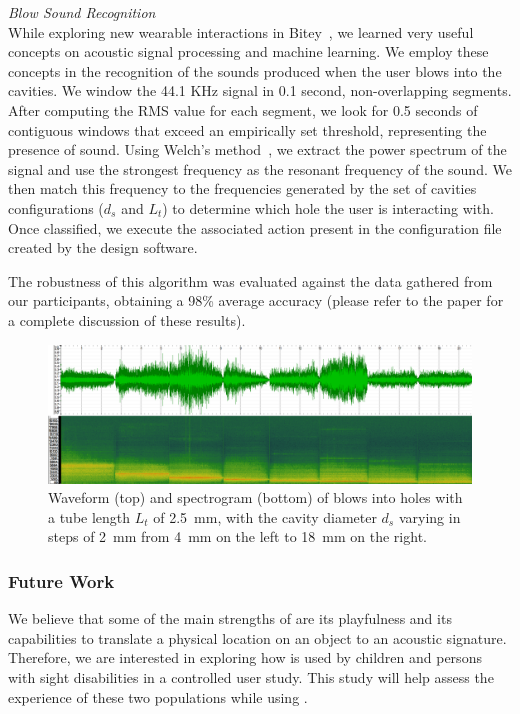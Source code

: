           \textit{Blow Sound Recognition}\\
            While exploring new wearable interactions in
            Bitey~\cite{Ashbrook:2016ek}, we learned very useful concepts on
            acoustic signal processing and machine learning. We employ these
            concepts in the recognition of the sounds produced when the user
            blows into the \bh cavities. We window the 44.1 KHz signal in 0.1
            second, non-overlapping segments. After computing the RMS value for
            each segment, we look for 0.5 seconds of contiguous windows that
            exceed an empirically set threshold, representing the presence of
            sound. Using Welch's method~\cite{Welch:1967jw}, we extract the
            power spectrum of the signal and use the strongest frequency as the
            resonant frequency of the sound. We then match this frequency to
            the frequencies generated by the set of cavities configurations
            ($d_s$ and $L_t$) to determine which hole the user is interacting
            with. Once classified, we execute the associated action present in
            the configuration file created by the design software.

            The robustness of this algorithm was evaluated against the data
            gathered from our participants, obtaining a 98\% average accuracy
            (please refer to the paper for a complete discussion of these
            results).

        \begin{figure}[t]
          \centering
            \includegraphics[width=\textwidth]{figures/spectrogram.png}
            \caption{Waveform (top) and spectrogram (bottom) of blows into
              holes with a tube length $L_t$ of 2.5~mm, with the cavity diameter
              $d_s$ varying in steps of 2~mm from 4~mm on the left to 18~mm on
              the right.}
            \label{fig:spectrogram}
        \end{figure}

      \subsubsection{Future Work}
        We believe that some of the main strengths of \bh are its playfulness
        and its capabilities to translate a physical location on an object to
        an acoustic signature. Therefore, we are interested in exploring how
        \bh is used by children and persons with sight disabilities in a
        controlled user study. This study will help assess the experience of
        these two populations while using \bh.

